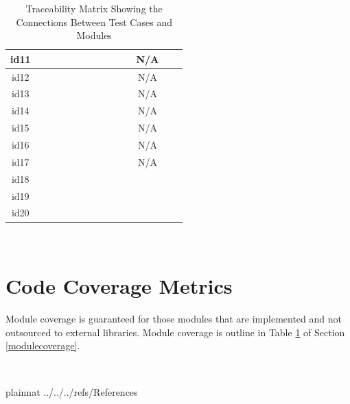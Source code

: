 \documentclass[12pt, titlepage]{article}
\begin{document}
\begin{table}[!h]
\begin{center}
\begin{tabular}{| c | c | c | c | c | c | c | c | c | c | c | c | c | c |}
			\hline
			id11 &\checkmark &\checkmark &\checkmark & \checkmark & \checkmark& \checkmark&\checkmark & \checkmark& \checkmark&\checkmark & N/A &\checkmark &\checkmark\\
			\hline
			id12 &\checkmark &\checkmark &\checkmark & \checkmark & \checkmark& \checkmark&\checkmark & \checkmark& \checkmark&\checkmark & N/A &\checkmark &\checkmark\\
			\hline
			id13 &\checkmark &\checkmark &\checkmark & \checkmark & \checkmark& \checkmark&\checkmark & \checkmark& \checkmark&\checkmark & N/A &\checkmark &\checkmark\\
			\hline
			id14 &\checkmark &\checkmark &\checkmark & \checkmark & \checkmark& \checkmark&\checkmark & \checkmark& \checkmark&\checkmark & N/A &\checkmark &\checkmark\\
			\hline
			id15 &\checkmark &\checkmark &\checkmark & \checkmark & \checkmark& \checkmark&\checkmark & \checkmark& \checkmark&\checkmark & N/A &\checkmark &\checkmark\\
			\hline
			id16 &\checkmark &\checkmark &\checkmark & \checkmark & \checkmark& \checkmark&\checkmark & \checkmark& \checkmark&\checkmark & N/A &\checkmark &\checkmark\\
			\hline
			id17 &\checkmark &\checkmark &\checkmark & \checkmark & \checkmark& \checkmark&\checkmark & \checkmark& \checkmark&\checkmark & N/A &\checkmark &\checkmark\\
			\hline
			id18 &\checkmark &\checkmark &\checkmark & \checkmark & \checkmark& \checkmark&\checkmark & \checkmark& \checkmark&\checkmark & \checkmark &\checkmark &\checkmark\\
			\hline
			id19 &\checkmark &\checkmark &\checkmark & \checkmark & \checkmark& \checkmark&\checkmark & \checkmark& \checkmark&\checkmark & \checkmark &\checkmark &\checkmark\\
			\hline
			id20 &\checkmark &\checkmark &\checkmark & \checkmark & \checkmark& \checkmark&\checkmark & \checkmark& \checkmark&\checkmark & \checkmark &\checkmark &\checkmark\\
			\hline
		\end{tabular}
		\caption{Traceability Matrix Showing the Connections Between Test Cases and Modules}
		\label{Table:MODCOV}
	\end{center}
\end{table}  	

~\newpage

\section{Code Coverage Metrics}

Module coverage is guaranteed for those modules that are implemented and not outsourced to external libraries. Module coverage is outline in Table \ref{Table:MODCOV} of Section \ref{modulecoverage}.

~\newpage

 {plainnat}
 {../../../refs/References}
\end{document}
